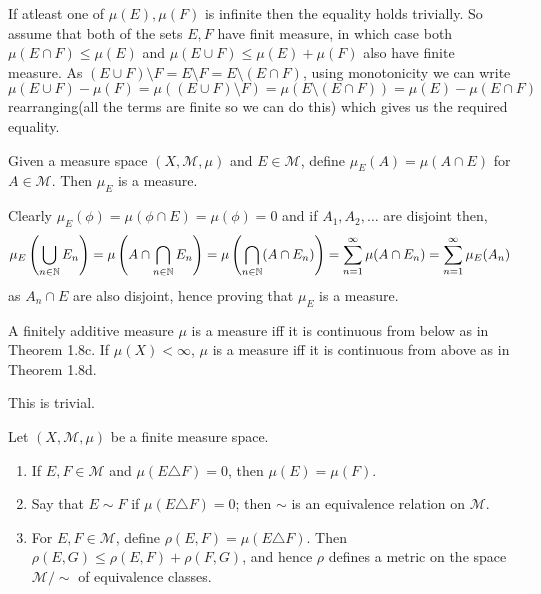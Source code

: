 \documentclass[12pt,a4paper]{article}
\begin{document}
\begin{solution}
    If atleast one of $\mu(E),\mu(F)$ is infinite then the equality holds trivially. 
    So assume that both of the sets $E,F$ have finit measure, in which case both $\mu(E\cap F)\leq\mu(E)$ and $\mu(E\cup F)\leq\mu(E)+\mu(F)$ also have finite measure. 
    As $(E\cup F)\setminus F=E\setminus F=E\setminus(E\cap F)$, using monotonicity we can write
    $$\mu(E\cup F)-\mu(F)=\mu((E\cup F)\setminus F)=\mu(E\setminus(E\cap F))=\mu(E)-\mu(E\cap F)$$
    rearranging(all the terms are finite so we can do this) which gives us the required equality.
\end{solution}
\begin{problem}\label{prob:1-10}
Given a measure space $(X, \mathcal{M}, \mu)$ and $E \in \mathcal{M}$, define $\mu_E(A) = \mu(A \cap E)$ for $A \in \mathcal{M}$. Then $\mu_E$ is a measure.
\end{problem}
\begin{solution}
    Clearly $\mu_E(\phi)=\mu(\phi\cap E)=\mu(\phi)=0$ and if $A_1,A_2,\ldots$ are disjoint then,
    $$\mu_E\left(\bigcup_{n\in\mathbb{N}}E_n\right)=\mu\left(A\cap\bigcap_{n\in\mathbb{N}}E_n\right)=\mu\left(\bigcap_{n\in\mathbb{N}}(A\cap E_n)\right)=\sum_{n=1}^{\infty}\mu(A\cap E_n)=\sum_{n=1}^\infty\mu_E(A_n)$$
    as $A_n\cap E$ are also disjoint, hence proving that $\mu_E$ is a measure.
\end{solution}
\begin{problem}\label{prob:1-11}
A finitely additive measure $\mu$ is a measure iff it is continuous from below as in Theorem 1.8c. If $\mu(X) < \infty$, $\mu$ is a measure iff it is continuous from above as in Theorem 1.8d.
\end{problem}
\begin{solution}
    This is trivial.
\end{solution}
\begin{problem}\label{prob:1-12}
Let $(X, \mathcal{M}, \mu)$ be a finite measure space.
\begin{enumerate}[label=\alph*.]
    \item If $E, F \in \mathcal{M}$ and $\mu(E \triangle F) = 0$, then $\mu(E) = \mu(F)$.
    \item Say that $E \sim F$ if $\mu(E \triangle F) = 0$; then $\sim$ is an equivalence relation on $\mathcal{M}$.
    \item For $E, F \in \mathcal{M}$, define $\rho(E, F) = \mu(E \triangle F)$. Then $\rho(E, G) \le \rho(E, F) + \rho(F, G)$, and hence $\rho$ defines a metric on the space $\mathcal{M} / \sim$ of equivalence classes.
\end{enumerate}
\end{problem}
\end{document}
